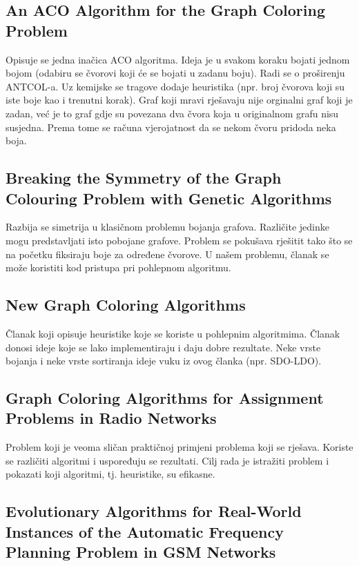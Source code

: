 \documentclass[times, utf8, diplomski, numeric]{fer}
\begin{document}
\subsection*{An ACO Algorithm for the Graph Coloring Problem \cite{lit4}}

Opisuje se jedna inačica ACO  algoritma. Ideja je u svakom koraku bojati 
jednom bojom (odabiru se čvorovi koji će se bojati u zadanu boju). Radi se o 
proširenju ANTCOL-a. Uz kemijske se tragove dodaje heuristika (npr. 
broj čvorova koji su iste boje kao i trenutni korak). Graf koji mravi rješavaju
nije orginalni graf koji je zadan, već je to graf gdje su povezana dva čvora
koja u originalnom grafu nisu susjedna. Prema tome se računa vjerojatnost da 
se nekom čvoru pridoda neka boja. 


\subsection*{Breaking the Symmetry of the Graph Colouring Problem with Genetic Algorithms \cite{lit5}}

Razbija se simetrija u klasičnom problemu bojanja grafova. Različite jedinke mogu predstavljati isto pobojane grafove. Problem se pokušava rješitit tako  što se na početku fiksiraju boje za određene čvorove. U našem problemu, članak se može koristiti kod pristupa pri pohlepnom algoritmu.

\subsection*{New Graph Coloring Algorithms \cite{lit7}}

Članak koji opisuje heuristike koje se koriste u pohlepnim algoritmima. Članak donosi ideje koje se lako implementiraju i daju dobre rezultate. Neke vrste bojanja i neke vrste sortiranja ideje vuku iz ovog članka (npr. SDO-LDO).

\subsection*{Graph Coloring Algorithms for Assignment Problems in Radio Networks \cite{lit10}}

Problem koji je veoma sličan praktičnoj primjeni problema koji se rješava. Koriste se različiti algoritmi i uspoređuju se rezultati. Cilj rada je istražiti problem i pokazati koji algoritmi, tj. heuristike, su efikasne.

\subsection*{Evolutionary Algorithms for Real-World Instances of the Automatic Frequency Planning Problem in GSM Networks \cite{lit12}}
\end{document}
